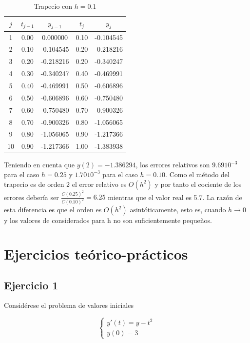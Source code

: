\documentclass{article}
\theoremstyle{theorem-style}  %
\theoremstyle{definition-style}
\theoremstyle{example-style}
\begin{document}
	\begin{table}[H]
		\centering
		\begin{tabular}{|| c | c | c | c | c ||}
			\hline
			\hline $j$ &  $t_{j-1}$ & $y_{j-1}$ & $t_j$ & $y_j$ \\
			\hline 1 & 0.00 & 0.000000 & 0.10 & -0.104545 \\
			\hline 2 & 0.10 & -0.104545 & 0.20 & -0.218216 \\
			\hline 3 & 0.20 & -0.218216 & 0.20 & -0.340247 \\
			\hline 4 & 0.30 & -0.340247 & 0.40 & -0.469991 \\
			\hline 5 & 0.40 & -0.469991 & 0.50 & -0.606896 \\
			\hline 6 & 0.50 & -0.606896 & 0.60 & -0.750480 \\
			\hline 7 & 0.60 & -0.750480 & 0.70 & -0.900326 \\
			\hline 8 & 0.70 & -0.900326 & 0.80 & -1.056065 \\
			\hline 9 & 0.80 & -1.056065 & 0.90 & -1.217366 \\
			\hline 10 & 0.90 & -1.217366 & 1.00 & -1.383938 \\
		\end{tabular}
		\caption{Trapecio con $h=0.1$}
		\label{table:trapecio-ejemplo2.2}
	\end{table}

	Teniendo en cuenta que $y(2)=-1.386294$, los errores relativos son $9.69 10^{-3}$ para el caso $h=0.25$ y $1.70 10^{-3}$ para el caso $h=0.10$. Como el método del trapecio es de orden 2 el error relativo es $O(h^2)$ y por tanto el cociente de los errores debería ser $\frac{C(0.25)^2}{C(0.10)^2}=6.25$ mientras que el valor real es 5.7. La razón de esta diferencia es que el orden es $O(h^2)$ asintóticamente, esto es, cuando $h \to 0$ y los valores de considerados para h no son suficientemente pequeños.

\section{Ejercicios teórico-prácticos} \label{ejtp}

\subsection{Ejercicio 1} \label{ejtp1}

Considérese el problema de valores iniciales

		\begin{equation*}
			\begin{cases}
				y'(t) = y - t^2 \\
				y(0) = 3
			\end{cases}
		\end{equation*}
\end{document}
